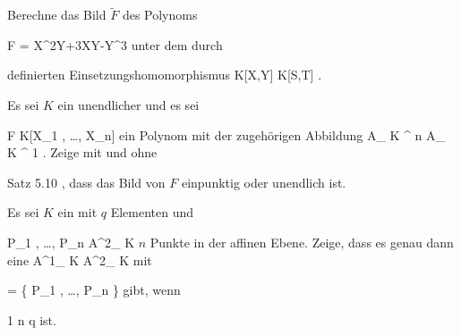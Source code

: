 {}
{





Berechne das Bild $\tilde{F}$
des Polynoms

\mavergleichskettedisp
{\vergleichskette
{F
}
{ =} { X^2Y+3XY-Y^3
}
{ } {
}
{ } {
}
{ } {
}
}
{}{}{}
unter dem durch

 {  }

definierten Einsetzungshomomorphismus
\maabbdisp {} {K[X,Y]  } { K[S,T]
} {.}





}
{} {}

{}
{





Es sei $K$ ein unendlicher
und es sei

\mavergleichskette
{\vergleichskette
{ F
}
{ \in }{ K[X_1 , \ldots , X_n]
}
{  }{
}
{    }{
}
{   }{
}
}
{}{}{}
ein Polynom mit der zugehörigen Abbildung
 { { {\mathbb A}_{  K }^{  n   } } } { { {\mathbb A}_{ K }^{  1   } }
} {.}
Zeige mit und ohne

Satz 5.10
,
dass das Bild von $F$ einpunktig oder unendlich ist.





}
{} {}

{}
{





Es sei $K$ ein
mit $q$ Elementen und

\mavergleichskettedisp
{\vergleichskette
{ P_1 , \ldots , P_n
}
{ \in} { {\mathbb A}^{2}_{ K }
}
{ } {
}
{ } {
}
{ } {
}
}
{}{}{}
$n$ Punkte in der affinen Ebene. Zeige, dass es genau dann eine
\maabbdisp {\varphi} { {\mathbb A}^{1}_{ K } } { {\mathbb A}^{2}_{ K }
} {}
mit

\mavergleichskette
{\vergleichskette
{   \varphi
}
{ = }{ \{ P_1 , \ldots , P_n \}
}
{  }{
}
{    }{
}
{   }{
}
}
{}{}{}
gibt, wenn

\mavergleichskette
{\vergleichskette
{ 1
}
{ \leq }{ n
}
{ \leq }{ q
}
{    }{
}
{   }{
}
}
{}{}{}
ist.





}
{} {}

